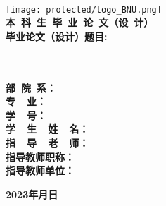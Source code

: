 
	

\begin{titlepage}
	\begin{center}
	\vspace*{-3em}\hrulefill
	\\	\vspace*{3em}
	{\texttt{[image: protected/logo\_BNU.png]}}
	\\[1em]
	{\textbf{\songti 本\ 科\ 生\ 毕\ 业\ 论\ 文（设\ 计）}}
	\\[6em]
	\textbf{\heiti 毕业论文（设计）题目:\quad\ \ \qquad\qquad\qquad\qquad\qquad\qquad\qquad\qquad}
	\\[0.5em]
	\textbf{\songti\underline{\makebox[28em][c]{\titlethesisCHNi}}}
	\\[0.5em]
	\textbf{\songti\underline{\makebox[28em][c]{\titlethesisCHNii}}}
	\\[4.5em]
	\end{center}
	\textbf{\songti \makebox[59pt][l]{}部\quad\ 院\quad\ 系：\quad}
	\\[0.7em]
	\textbf{\songti \makebox[59pt][l]{}专\qquad\quad\ \ 业：\quad}
	\\[0.7em]
	\textbf{\songti \makebox[59pt][l]{}学\qquad\quad\ \ 号：\quad}
	\\[0.7em]
	\textbf{\songti \makebox[59pt][l]{}学\ \ 生\ \ 姓\ \ 名：\quad}
	\\[0.7em]
	\textbf{\songti \makebox[59pt][l]{}指\ \ 导\ \ 老\ \ 师：\quad}
	\\[0.7em]
	\textbf{\songti \makebox[59pt][l]{}指导教师职称：\quad}
	\\[0.7em]
	\textbf{\songti \makebox[59pt][l]{}指导教师单位：\quad}
	\\[3em]
	\begin{center}
	\textbf{\qquad\qquad\qquad 2023年\quad 月\quad 日}

	\vfill
	
	\end{center}
\end{titlepage}